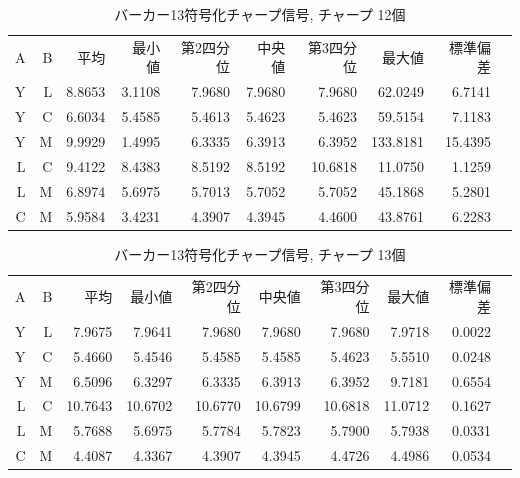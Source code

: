 \begin{table}[p]\centering
  \caption{バーカー13符号化チャープ信号, チャープ 12個}
  \label{tab:hikaku11}
  \begin{tabular}{rrrrrrrrrr}
    \hline
     A & B & 平均 & 最小値 & 第2四分位 & 中央値 & 第3四分位 & 最大値 & 標準偏差 \\
     Y & L & 8.8653 & 3.1108 & 7.9680 & 7.9680 & 7.9680 & 62.0249 & 6.7141 \\
     Y & C & 6.6034 & 5.4585 & 5.4613 & 5.4623 & 5.4623 & 59.5154 & 7.1183 \\
     Y & M & 9.9929 & 1.4995 & 6.3335 & 6.3913 & 6.3952 & 133.8181 & 15.4395 \\
     L & C & 9.4122 & 8.4383 & 8.5192 & 8.5192 & 10.6818 & 11.0750 & 1.1259 \\
     L & M & 6.8974 & 5.6975 & 5.7013 & 5.7052 & 5.7052 & 45.1868 & 5.2801 \\
     C & M & 5.9584 & 3.4231 & 4.3907 & 4.3945 & 4.4600 & 43.8761 & 6.2283 \\
    \hline
  \end{tabular}
\end{table}

\begin{table}[p]\centering
  \caption{バーカー13符号化チャープ信号, チャープ 13個}
  \label{tab:hikaku12}
  \begin{tabular}{rrrrrrrrrr}
    \hline
     A & B & 平均 & 最小値 & 第2四分位 & 中央値 & 第3四分位 & 最大値 & 標準偏差 \\
     Y & L & 7.9675 & 7.9641 & 7.9680 & 7.9680 & 7.9680 & 7.9718 & 0.0022 \\
     Y & C & 5.4660 & 5.4546 & 5.4585 & 5.4585 & 5.4623 & 5.5510 & 0.0248 \\
     Y & M & 6.5096 & 6.3297 & 6.3335 & 6.3913 & 6.3952 & 9.7181 & 0.6554 \\
     L & C & 10.7643 & 10.6702 & 10.6770 & 10.6799 & 10.6818 & 11.0712 & 0.1627 \\
     L & M & 5.7688 & 5.6975 & 5.7784 & 5.7823 & 5.7900 & 5.7938 & 0.0331 \\
     C & M & 4.4087 & 4.3367 & 4.3907 & 4.3945 & 4.4726 & 4.4986 & 0.0534 \\
    \hline
  \end{tabular}
\end{table}

